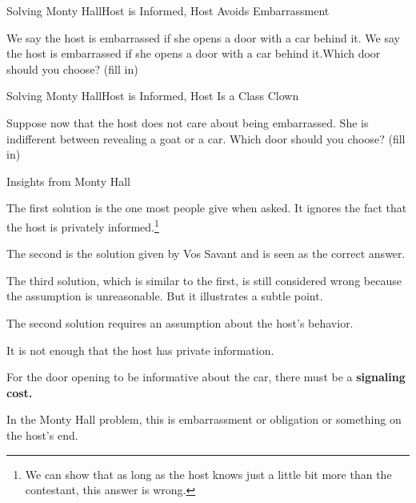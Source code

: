 \documentclass[aspectratio=169]{beamer}
\newenvironment{wideitemize}{\itemize\addtolength{\itemsep}{10pt}}{\enditemize}
\begin{document}
\begin{frame}{Solving Monty Hall}{Host is Informed, Host Avoids Embarrassment}

We say the host is embarrassed if she opens a door with a car behind it. We say the host is embarrassed if she opens a door with a car behind it.Which door should you choose? (fill in)

\vspace{5.5cm}

    
\end{frame}

\begin{frame}{Solving Monty Hall}{Host is Informed, Host Is a Class Clown}

 Suppose now that the host does not care about being embarrassed. She is indifferent between revealing a goat or a car. Which door should you choose? (fill in)

\vspace{5.5cm}

    
\end{frame}

\begin{frame}{Insights from Monty Hall}

\begin{wideitemize}
    \item The first solution is the one most people give when asked. It ignores the fact that the host is privately informed.\footnote{We can show that as long as the host knows just a little bit more than the contestant, this answer is wrong.}
    
    \item The second is the solution given by Vos Savant and is seen as the correct answer.
    
    \item The third solution, which is similar to the first, is still considered wrong because the assumption is unreasonable. But it illustrates a subtle point.
    
    \begin{wideitemize}
        \item The second solution requires an assumption about the host's behavior.
        \item It is not enough that the host has private information.
        
        \item For the door opening to be informative about the car, there must be a \textbf{signaling cost.}
        \item In the Monty Hall problem, this is embarrassment or obligation or something on the host's end.
    \end{wideitemize}
\end{wideitemize}
    
\end{frame}
\end{document}
